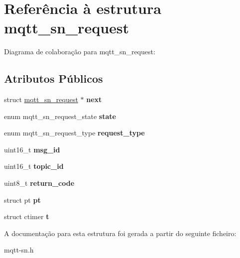 \hypertarget{structmqtt__sn__request}{\section{Referência à estrutura mqtt\+\_\+sn\+\_\+request}
\label{structmqtt__sn__request}
}


Diagrama de colaboração para mqtt\+\_\+sn\+\_\+request\+:
\subsection*{Atributos Públicos}
\begin{DoxyCompactItemize}
\item 
\hypertarget{structmqtt__sn__request_a195d599166341c09999ab1d2ecad64c1}{struct \hyperlink{structmqtt__sn__request}{mqtt\+\_\+sn\+\_\+request} $\ast$ {\bfseries next}}\label{structmqtt__sn__request_a195d599166341c09999ab1d2ecad64c1}

\item 
\hypertarget{structmqtt__sn__request_a3f7d86f3095ab0c85a2f72e117ad9e3d}{enum mqtt\+\_\+sn\+\_\+request\+\_\+state {\bfseries state}}\label{structmqtt__sn__request_a3f7d86f3095ab0c85a2f72e117ad9e3d}

\item 
\hypertarget{structmqtt__sn__request_afaf1a5289799f1ce19effa4201b2d266}{enum mqtt\+\_\+sn\+\_\+request\+\_\+type {\bfseries request\+\_\+type}}\label{structmqtt__sn__request_afaf1a5289799f1ce19effa4201b2d266}

\item 
\hypertarget{structmqtt__sn__request_a81cd1d5b87fc8c18593ae6c6593a8664}{uint16\+\_\+t {\bfseries msg\+\_\+id}}\label{structmqtt__sn__request_a81cd1d5b87fc8c18593ae6c6593a8664}

\item 
\hypertarget{structmqtt__sn__request_a49717cc0f847c6c4bb16b1b58322a0fe}{uint16\+\_\+t {\bfseries topic\+\_\+id}}\label{structmqtt__sn__request_a49717cc0f847c6c4bb16b1b58322a0fe}

\item 
\hypertarget{structmqtt__sn__request_af408a82a1506cbc1dbcc9a9b96799dc4}{uint8\+\_\+t {\bfseries return\+\_\+code}}\label{structmqtt__sn__request_af408a82a1506cbc1dbcc9a9b96799dc4}

\item 
\hypertarget{structmqtt__sn__request_a3bf0b52ec2d6ecdc167eb0e4cc15b62c}{struct pt {\bfseries pt}}\label{structmqtt__sn__request_a3bf0b52ec2d6ecdc167eb0e4cc15b62c}

\item 
\hypertarget{structmqtt__sn__request_af267ab5f24fe90e902976dd723775986}{struct ctimer {\bfseries t}}\label{structmqtt__sn__request_af267ab5f24fe90e902976dd723775986}

\end{DoxyCompactItemize}


A documentação para esta estrutura foi gerada a partir do seguinte ficheiro\+:\begin{DoxyCompactItemize}
\item 
mqtt-\/sn.\+h\end{DoxyCompactItemize}
